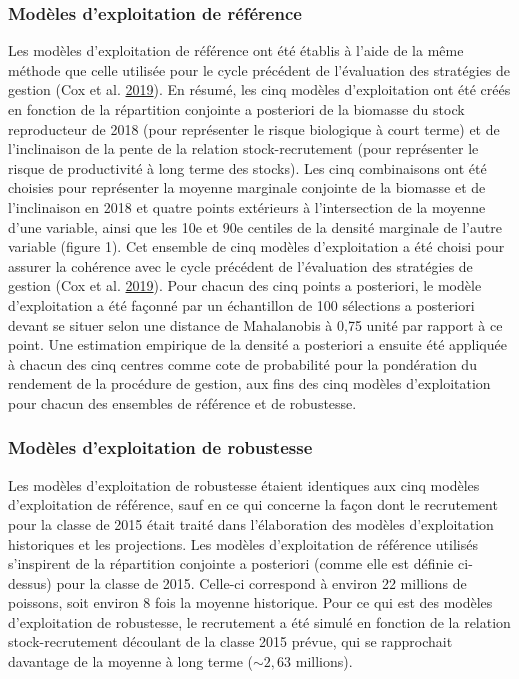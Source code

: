 \documentclass[11pt]{book}
\begin{document}
\hypertarget{moduxe8les-dexploitation-de-ruxe9fuxe9rence}{%
\subsubsection{Modèles d'exploitation de référence}\label{moduxe8les-dexploitation-de-ruxe9fuxe9rence}}

Les modèles d'exploitation de référence ont été établis à l'aide de la même méthode que celle utilisée pour le cycle précédent de l'évaluation des stratégies de gestion (Cox et al. \protect\hyperlink{ref-cox2019evaluating}{2019}). En résumé, les cinq modèles d'exploitation ont été créés en fonction de la répartition conjointe a posteriori de la biomasse du stock reproducteur de 2018 (pour représenter le risque biologique à court terme) et de l'inclinaison de la pente de la relation stock-recrutement (pour représenter le risque de productivité à long terme des stocks). Les cinq combinaisons ont été choisies pour représenter la moyenne marginale conjointe de la biomasse et de l'inclinaison en 2018 et quatre points extérieurs à l'intersection de la moyenne d'une variable, ainsi que les 10e et 90e centiles de la densité marginale de l'autre variable (figure 1). Cet ensemble de cinq modèles d'exploitation a été choisi pour assurer la cohérence avec le cycle précédent de l'évaluation des stratégies de gestion (Cox et al. \protect\hyperlink{ref-cox2019evaluating}{2019}). Pour chacun des cinq points a posteriori, le modèle d'exploitation a été façonné par un échantillon de 100 sélections a posteriori devant se situer selon une distance de Mahalanobis à 0,75 unité par rapport à ce point. Une estimation empirique de la densité a posteriori a ensuite été appliquée à chacun des cinq centres comme cote de probabilité pour la pondération du rendement de la procédure de gestion, aux fins des cinq modèles d'exploitation pour chacun des ensembles de référence et de robustesse.

\hypertarget{moduxe8les-dexploitation-de-robustesse}{%
\subsubsection{Modèles d'exploitation de robustesse}\label{moduxe8les-dexploitation-de-robustesse}}

Les modèles d'exploitation de robustesse étaient identiques aux cinq modèles d'exploitation de référence, sauf en ce qui concerne la façon dont le recrutement pour la classe de 2015 était traité dans l'élaboration des modèles d'exploitation historiques et les projections. Les modèles d'exploitation de référence utilisés s'inspirent de la répartition conjointe a posteriori (comme elle est définie ci-dessus) pour la classe de 2015. Celle-ci correspond à environ 22 millions de poissons, soit environ 8 fois la moyenne historique. Pour ce qui est des modèles d'exploitation de robustesse, le recrutement a été simulé en fonction de la relation stock-recrutement découlant de la classe 2015 prévue, qui se rapprochait davantage de la moyenne à long terme (\(\sim 2,63\) millions).
\end{document}
